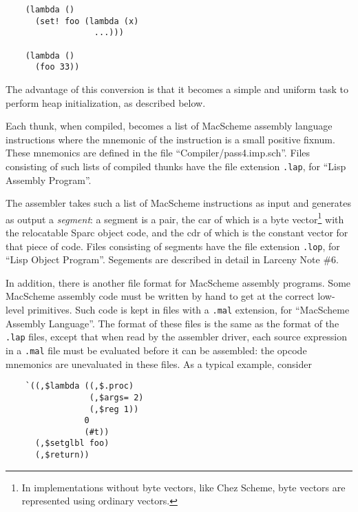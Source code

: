 \begin{minipage}{\linewidth}
\begin{verbatim}
    (lambda ()
      (set! foo (lambda (x)
                  ...)))

    (lambda ()
      (foo 33))
\end{verbatim}
\end{minipage}

\noindent The advantage of this conversion is that it becomes a simple and
uniform task to perform heap initialization, as described below.

Each thunk, when compiled, becomes a list of MacScheme assembly language
instructions where the mnemonic of the instruction is a small positive
fixnum. These mnemonics are defined in the file ``Compiler/pass4.imp.sch''.
Files consisting of such lists of compiled thunks have the file 
extension {\tt .lap}, for ``Lisp Assembly Program''.

The assembler takes such a list of MacScheme instructions as input and
generates as output a {\em segment}: a segment is a pair, the car of
which is a byte vector\footnote{In implementations without byte
vectors, like Chez Scheme, byte vectors are represented using ordinary
vectors.} with the relocatable Sparc object code, and the cdr of which
is the constant vector for that piece of code.  Files consisting of
segments have the file extension {\tt .lop}, for ``Lisp Object
Program''. Segements are described in detail in Larceny Note \#6.

In addition, there is another file format for MacScheme assembly
programs.  Some MacScheme assembly code must be written by hand to get
at the correct low-level primitives. Such code is kept in files with a
{\tt .mal} extension, for ``MacScheme Assembly Language''. The format
of these files is the same as the format of the {\tt .lap} files,
except that when read by the assembler driver, each source expression
in a {\tt .mal} file must be evaluated before it can be assembled: the
opcode mnemonics are unevaluated in these files.  As a typical
example, consider

\begin{minipage}{\linewidth}
\begin{verbatim}
    `((,$lambda ((,$.proc)
                 (,$args= 2)
                 (,$reg 1))
                0
                (#t))
      (,$setglbl foo)
      (,$return))
\end{verbatim}
\end{minipage}

